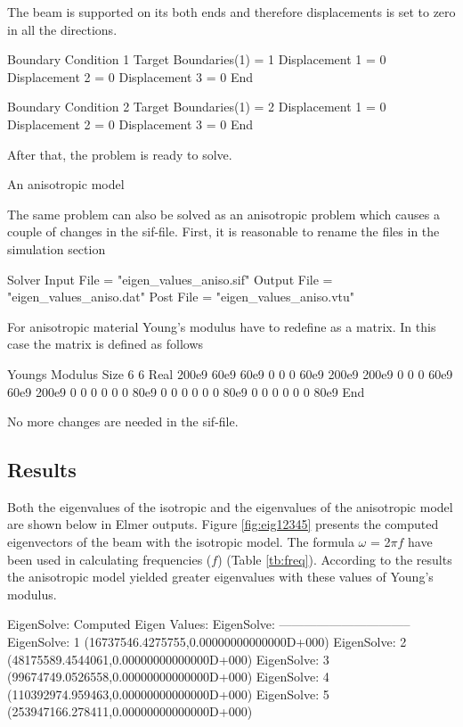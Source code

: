 \begin{flushleft}
The beam is supported on its both ends and therefore displacements is set to zero in all the directions.

\ttbegin  
Boundary Condition 1
  Target Boundaries(1) = 1
  Displacement 1 = 0
  Displacement 2 = 0
  Displacement 3 = 0  
End

Boundary Condition 2
  Target Boundaries(1) = 2
  Displacement 1 = 0
  Displacement 2 = 0
  Displacement 3 = 0  
End
\ttend  

After that, the problem is ready to solve.
\linebreak[4]

\begin{bf}
An anisotropic model
\end{bf}
\linebreak[2]

The same problem can also be solved as an anisotropic problem
which causes a couple of changes in the sif-file.
First, it is reasonable to rename the files in the simulation section

\ttbegin
Solver Input File = "eigen_values_aniso.sif"
Output File = "eigen_values_aniso.dat"
Post File = "eigen_values_aniso.vtu"
\ttend

For anisotropic material Young's modulus have to redefine as a matrix. 
In this case the matrix is defined as follows

\ttbegin
Youngs Modulus
Size 6 6
    Real  200e9  60e9   60e9   0     0     0      
          60e9   200e9  200e9  0     0     0      
          60e9   60e9   200e9  0     0     0      
          0      0      0      80e9  0     0      
          0      0      0      0     80e9  0      
          0      0      0      0     0     80e9   
    End
\ttend

No more changes are needed in the sif-file.

\end{flushleft}
\subsection*{Results}
Both the eigenvalues of the isotropic and the eigenvalues of the anisotropic model are shown below in Elmer outputs. Figure \ref{fig:eig12345} presents the computed eigenvectors of the beam with the isotropic model. The formula $\omega$ = 2$\pi$$f$ have been used in calculating frequencies ($f$)
(Table \ref{tb:freq}).
According to the results the anisotropic model yielded greater eigenvalues with
these values of Young's modulus.  


\ttbegin
EigenSolve: Computed Eigen Values:
EigenSolve: --------------------------------
EigenSolve:            1        (16737546.4275755,0.00000000000000D+000)
EigenSolve:            2        (48175589.4544061,0.00000000000000D+000)
EigenSolve:            3        (99674749.0526558,0.00000000000000D+000)
EigenSolve:            4        (110392974.959463,0.00000000000000D+000)
EigenSolve:            5        (253947166.278411,0.00000000000000D+000)

